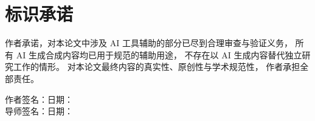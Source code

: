 \section*{标识承诺}

作者承诺，对本论文中涉及 AI 工具辅助的部分已尽到合理审查与验证义务，
所有 AI 生成合成内容均已用于规范的辅助用途，
不存在以 AI 生成内容替代独立研究工作的情形。
对本论文最终内容的真实性、原创性与学术规范性，
作者承担全部责任。

\vspace{2em}
\begin{flushright}
作者签名：\underline{\hspace{4cm}}\quad\quad 日期：\underline{\hspace{3cm}} \\[1em]
导师签名：\underline{\hspace{4cm}}\quad\quad 日期：\underline{\hspace{3cm}}
\end{flushright}
